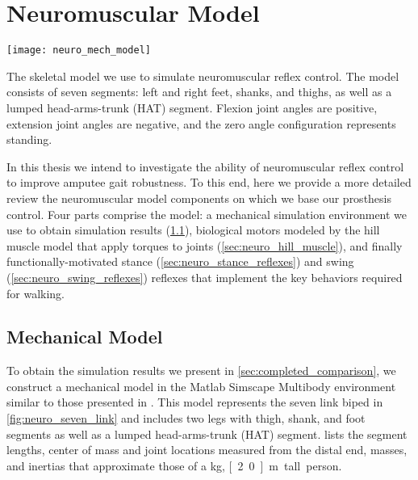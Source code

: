 \chapter{Neuromuscular Model}\label{sec:neuro_model}
\begin{marginfigure}
    \centering
    \texttt{[image: neuro\_mech\_model]}
    \caption{The skeletal model we use to simulate neuromuscular reflex control.
    The model consists of seven segments: left and right feet, shanks, and
    thighs, as well as a lumped head-arms-trunk (HAT) segment. Flexion joint
    angles are positive, extension joint angles are negative, and the zero
    angle configuration represents standing.}
    \label{fig:neuro_seven_link}
\end{marginfigure}

In this thesis we intend to investigate the ability of neuromuscular reflex
control to improve amputee gait robustness. To this end, here we provide a more
detailed review the neuromuscular model components on which we base our
prosthesis control. Four parts comprise the model: a mechanical simulation
environment we use to obtain simulation results (\cref{sec:neuro_mech_model}),
biological motors modeled by the hill muscle model that apply torques to joints
(\cref{sec:neuro_hill_muscle}), and finally functionally-motivated stance
(\cref{sec:neuro_stance_reflexes}) and swing (\cref{sec:neuro_swing_reflexes})
reflexes that implement the key behaviors required for walking.

\section{Mechanical Model}\label{sec:neuro_mech_model}

To obtain the simulation results we present in \cref{sec:completed_comparison},
we construct a mechanical model in the Matlab Simscape Multibody environment
similar to those presented in \citet{geyer2010muscle, song2015neural}. This
model represents the seven link biped in \cref{fig:neuro_seven_link} and
includes two legs with thigh, shank, and foot segments as well as a lumped
head-arms-trunk (HAT) segment.  lists the segment
lengths, center of mass and joint locations measured from the distal end,
masses, and inertias that approximate those of a \unit[80]{kg}, \unit[2.0]{m}
tall person.

